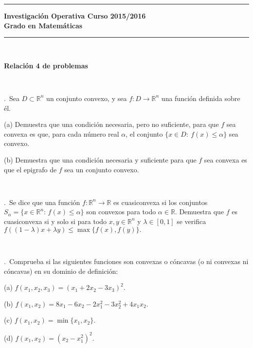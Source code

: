 \documentclass[11pt,a4paper,twoside]{article}
\newcounter{problem} \setcounter{problem}{1}
\newcommand{\ex}{\noindent {\sf \bf \theproblem}\addtocounter{problem}{1}.\ }
\begin{document}



\hrule
\bigskip
\textbf{Investigación Operativa   \hfill Curso 2015/2016\\
Grado en Matemáticas}
\bigskip
\hrule

\


\begin{center}  {\bf \large
Relaci\'{o}n 4 de problemas}
\end{center}

\


\ex Sea  $D\subset\mathbb{R}^n$ un
conjunto convexo, y sea $f:D\to \mathbb{R}^n$ una funci{\'o}n
definida sobre {\'e}l. 
\begin{compactitem}
\item[(a)] Demuestra que una condici{\'o}n necesaria, pero no suficiente,
para que $f$ sea convexa es que, para cada n{\'u}mero real $\alpha$,
el conjunto $\{x\in D:\ f(x)\leq \alpha\}$ sea convexo.
\item[(b)] Demuestra que una condici{\'o}n necesaria y suficiente para que
$f$ sea convexa es que el epigrafo de $f$ sea un conjunto convexo.
\end{compactitem}


\

\ex Se dice que una función $f:\mathbb{R}^n\to\mathbb{R}$ es cuasiconvexa si los conjuntos $S_\alpha=\{x\in\mathbb{R}^n:\, f(x)\leq \alpha\}$ son convexos para todo $\alpha\in\mathbb{R}$. Demuestra que  $f$ es cuasiconvexa si y solo si para todo $x,y\in\mathbb{R}^n$ y $\lambda\in [0,1]$ se verifica $f((1-\lambda)x+\lambda y)\leq \max\{f(x),f(y)\}.$ 


\




\ex Comprueba si las siguientes funciones son convexas o cóncavas (o ni convexas ni cóncavas) en su dominio de definición:
\begin{compactitem}
\item[(a)] $f(x_1,x_2,x_3)=(x_1+2x_2-3x_3)^2$.
\item[(b)] $f(x_1,x_2)=8x_1-6x_2-2x_1^2-3x_2^2+4x_1x_2$.
\item[(c)] $f(x_1,x_2)=\min\{x_1,x_2\}$.
\item[(d)] $f(x_1,x_2)=(x_2-x_1^2)^2$.
\end{compactitem}


\
\end{document}
